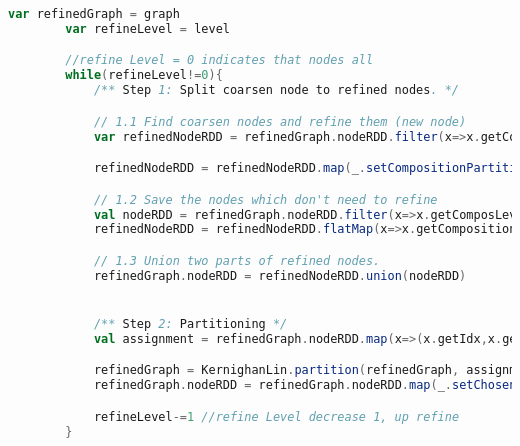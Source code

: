 \begin{lstlisting}[language=Scala]
var refinedGraph = graph
        var refineLevel = level

        //refine Level = 0 indicates that nodes all
        while(refineLevel!=0){
            /** Step 1: Split coarsen node to refined nodes. */

            // 1.1 Find coarsen nodes and refine them (new node)
            var refinedNodeRDD = refinedGraph.nodeRDD.filter(x=>x.getComposLevel==refineLevel)

            refinedNodeRDD = refinedNodeRDD.map(_.setCompositionPartition())

            // 1.2 Save the nodes which don't need to refine
            val nodeRDD = refinedGraph.nodeRDD.filter(x=>x.getComposLevel!=refineLevel)
            refinedNodeRDD = refinedNodeRDD.flatMap(x=>x.getComposition)

            // 1.3 Union two parts of refined nodes.
            refinedGraph.nodeRDD = refinedNodeRDD.union(nodeRDD)


            /** Step 2: Partitioning */
            val assignment = refinedGraph.nodeRDD.map(x=>(x.getIdx,x.getPartition))

            refinedGraph = KernighanLin.partition(refinedGraph, assignment, needMaxGain = true)
            refinedGraph.nodeRDD = refinedGraph.nodeRDD.map(_.setChosen(false))

            refineLevel-=1 //refine Level decrease 1, up refine
        }

\end{lstlisting}
